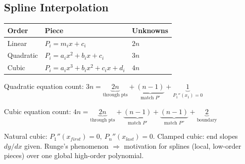 \subsection{Spline Interpolation}
\begin{formulabox}
\begin{center}
\begin{tabular}{@{}lll@{}}
\toprule
Order & Piece & Unknowns \\
\midrule
Linear & $P_i = m_i x + c_i$ & $2n$ \\
Quadratic & $P_i = a_i x^2+b_ix+c_i$ & $3n$ \\
Cubic & $P_i = a_ix^3+b_ix^2+c_ix+d_i$ & $4n$ \\
\bottomrule
\end{tabular}
\end{center}
Quadratic equation count: $3n = \underbrace{2n}_{\text{through pts}} + \underbrace{(n-1)}_{\text{match }P'} + \underbrace{1}_{P_1''(x_1)=0}$

Cubic equation count: $4n = \underbrace{2n}_{\text{through pts}} + \underbrace{(n-1)}_{\text{match }P'} + \underbrace{(n-1)}_{\text{match }P''} + \underbrace{2}_{\text{boundary}}$

Natural cubic: $P_1''(x_{first})=0,\ P_n''(x_{last})=0$. Clamped cubic: end slopes $dy/dx$ given.
Runge's phenomenon $\Rightarrow$ motivation for splines (local, low-order pieces) over one global high-order polynomial.
\end{formulabox}
